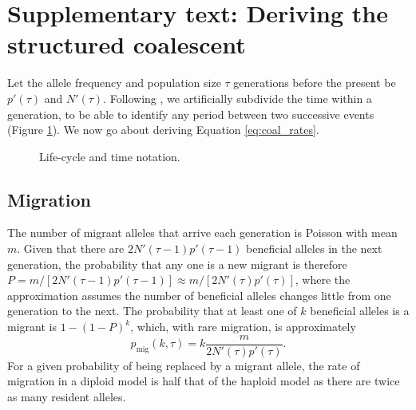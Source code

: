 \documentclass[]{article}
\begin{document}
\section*{Supplementary text: Deriving the structured coalescent}
\label{sec:derive_coalescent}
%
Let the allele frequency and population size $\tau$ generations before the present be $p'(\tau)$ and $N'(\tau)$.
Following \cite{pennings2006soft2}, we artificially subdivide the time within a generation, to be able to identify any period between two successive events (Figure \ref{fig:lifecycle}).
We now go about deriving Equation \ref{eq:coal_rates}.
%
\begin{figure}[!htbp]
\centering
{}
\caption{
Life-cycle and time notation.
}%
\label{fig:lifecycle}
\end{figure}
%
\subsection*{Migration}
%
The number of migrant alleles that arrive each generation is Poisson with mean $m$. 
Given that there are $2N'(\tau-1)p'(\tau-1)$ beneficial alleles in the next generation, the probability that any one is a new migrant is therefore $P = m/[2N'(\tau-1)p'(\tau-1)]\approx m/[2N'(\tau)p'(\tau)]$, where the approximation assumes the number of beneficial alleles changes little from one generation to the next.
The probability that at least one of $k$ beneficial alleles is a migrant is $1-(1-P)^k$, which, with rare migration, is approximately 
\begin{equation}
p_\mathrm{mig}(k,\tau) = k \frac{m}{2N'(\tau)p'(\tau)}.
\end{equation}
For a given probability of being replaced by a migrant allele, the rate of migration in a diploid model is half that of the haploid model \citep[equation 15 in][replacing $M$ with $m$]{pennings2006soft2} as there are twice as many resident alleles.
%
\end{document}
